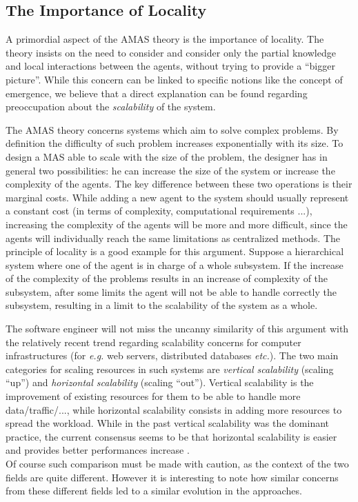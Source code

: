 \subsection{The Importance of Locality}

A primordial aspect of the AMAS theory is the importance of locality. The theory insists on the need to consider and consider only the partial knowledge and local interactions between the agents, without trying to provide a \enquote{bigger picture}. While this concern can be linked to specific notions like the concept of emergence, we believe that a direct explanation can be found regarding preoccupation about the \emph{scalability} of the system.

The AMAS theory concerns systems which aim to solve complex problems. By definition the difficulty of such problem increases exponentially with its size. To design a MAS able to scale with the size of the problem, the designer has in general two possibilities: he can increase the size of the system or increase the complexity of the agents. The key difference between these two operations is their marginal costs. While adding a new agent to the system should usually represent a constant cost (in terms of complexity, computational requirements ...), increasing the complexity of the agents will be more and more difficult, since the agents will individually reach the same limitations as centralized methods. The principle of locality is a good example for this argument. Suppose a hierarchical system where one of the agent is in charge of a whole subsystem. If the increase of the complexity of the problems results in an increase of complexity of the subsystem, after some limits the agent will not be able to handle correctly the subsystem, resulting in a limit to the scalability of the system as a whole.

The software engineer will not miss the uncanny similarity of this argument with the relatively recent trend regarding scalability concerns for computer infrastructures (for \emph{e.g.} web servers, distributed databases \emph{etc.}). The two main categories for scaling resources in such systems are \emph{vertical scalability} (scaling \enquote{up}) and \emph{horizontal scalability} (scaling \enquote{out}). Vertical scalability is the improvement of existing resources for them to be able to handle more data/traffic/..., while horizontal scalability consists in adding more resources to spread the workload. While in the past vertical scalability was the dominant practice, the current consensus seems to be that horizontal scalability is easier and provides better performances increase \cite{michael2007scale}.\\
Of course such comparison must be made with caution, as the context of the two fields are quite different. However it is interesting to note how similar concerns from these different fields led to a similar evolution in the approaches.

